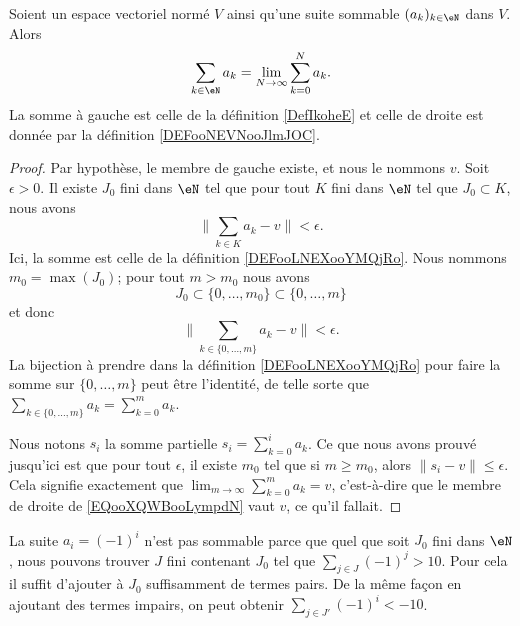 \begin{lemma}       \label{LEMooGXPGooZTJPoN}
	Soient un espace vectoriel normé \( V\) ainsi qu'une suite sommable \( (a_k)_{k\in \eN}\) dans \( V\). Alors
	\begin{equation}		\label{EQooXQWBooLympdN}
		\sum_{k\in \eN}a_k=\lim_{N\to \infty} \sum_{k=0}^N a_k.
	\end{equation}
	La somme à gauche est celle de la définition \ref{DefIkoheE} et celle de droite est donnée par la définition \ref{DEFooNEVNooJlmJOC}.
\end{lemma}

\begin{proof}
	Par hypothèse, le membre de gauche existe, et nous le nommons \( v\). Soit \( \epsilon>0\). Il existe \( J_0\) fini dans \( \eN\) tel que pour tout \( K\) fini dans \( \eN\) tel que \( J_0\subset K\), nous avons
	\begin{equation}
		\| \sum_{k\in K}a_k-v \|<\epsilon.
	\end{equation}
	Ici, la somme est celle de la définition \ref{DEFooLNEXooYMQjRo}. Nous nommons \( m_0=\max(J_0)\); pour tout \( m>m_0\) nous avons
	\begin{equation}
		J_0\subset \{ 0,\ldots,m_0 \}\subset\{ 0,\ldots,m \}
	\end{equation}
	et donc
	\begin{equation}
		\| \sum_{k\in \{ 0,\ldots,m \}}a_k-v \|<\epsilon.
	\end{equation}
	La bijection à prendre dans la définition \eqref{DEFooLNEXooYMQjRo} pour faire la somme sur \( \{ 0,\ldots,m \}\) peut être l'identité, de telle sorte que \( \sum_{k\in\{ 0,\ldots,m \}}a_k=\sum_{k=0}^ma_k\).

	Nous notons \( s_i\) la somme partielle \( s_i=\sum_{k=0}^ia_k\). Ce que nous avons prouvé jusqu'ici est que pour tout \( \epsilon\), il existe \( m_0\) tel que si \( m\geq m_0\), alors \( \| s_i-v \|\leq \epsilon\). Cela signifie exactement que \( \lim_{m\to\infty}\sum_{k=0}^ma_k=v\), c'est-à-dire que le membre de droite de \eqref{EQooXQWBooLympdN} vaut \( v\), ce qu'il fallait.
\end{proof}

\begin{example}
	La suite \( a_i=(-1)^i\) n'est pas sommable parce que quel que soit \( J_0\) fini dans \( \eN\), nous pouvons trouver \( J\) fini contenant \( J_0\) tel que \( \sum_{j\in J}(-1)^j>10\). Pour cela il suffit d'ajouter à \( J_0\) suffisamment de termes pairs. De la même façon en ajoutant des termes impairs, on peut obtenir \( \sum_{j\in J'}(-1)^i<-10\).
\end{example}

